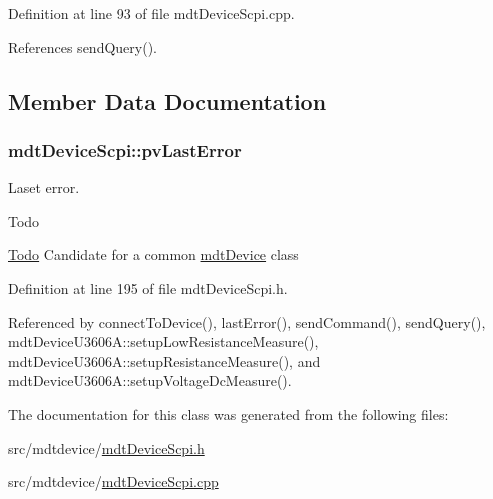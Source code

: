 Definition at line 93 of file mdt\-Device\-Scpi.\-cpp.



References send\-Query().



\subsection{Member Data Documentation}
\hypertarget{classmdt_device_scpi_a3dd77a6f3aeae13cea5b419185147864}{
\subsubsection[{pv\-Last\-Error}]{ mdt\-Device\-Scpi\-::pv\-Last\-Error\hspace{0.3cm}{\ttfamily [protected]}}}\label{classmdt_device_scpi_a3dd77a6f3aeae13cea5b419185147864}


Laset error. 

\begin{DoxyRefDesc}{Todo}
\item[\hyperlink{todo__todo000021}{Todo}]Candidate for a common \hyperlink{classmdt_device}{mdt\-Device} class \end{DoxyRefDesc}


Definition at line 195 of file mdt\-Device\-Scpi.\-h.



Referenced by connect\-To\-Device(), last\-Error(), send\-Command(), send\-Query(), mdt\-Device\-U3606\-A\-::setup\-Low\-Resistance\-Measure(), mdt\-Device\-U3606\-A\-::setup\-Resistance\-Measure(), and mdt\-Device\-U3606\-A\-::setup\-Voltage\-Dc\-Measure().



The documentation for this class was generated from the following files\-:\begin{DoxyCompactItemize}
\item 
src/mdtdevice/\hyperlink{mdt_device_scpi_8h}{mdt\-Device\-Scpi.\-h}\item 
src/mdtdevice/\hyperlink{mdt_device_scpi_8cpp}{mdt\-Device\-Scpi.\-cpp}\end{DoxyCompactItemize}
